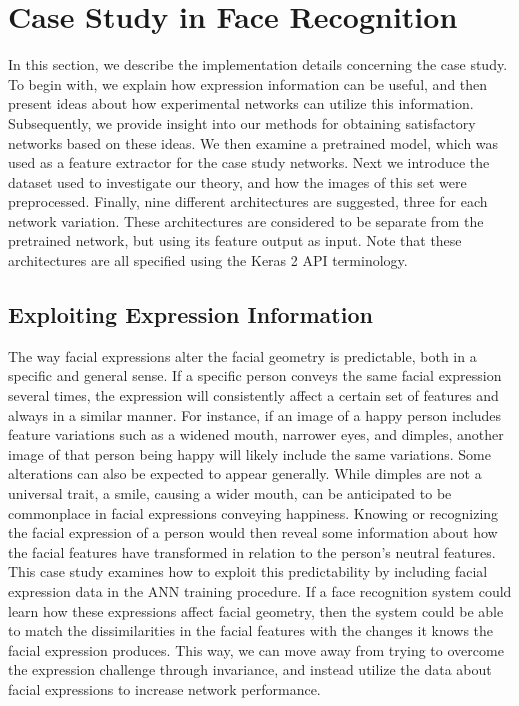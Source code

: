 \section{Case Study in Face Recognition}

In this section, we describe the implementation details concerning the case study. To begin with, we explain how expression information can be useful, and then present ideas about how experimental networks can utilize this information. Subsequently, we provide insight into our methods for obtaining satisfactory networks based on these ideas. We then examine a pretrained model, which was used as a feature extractor for the case study networks. Next we introduce the dataset used to investigate our theory, and how the images of this set were preprocessed. Finally, nine different architectures are suggested, three for each network variation. These architectures are considered to be separate from the pretrained network, but using its feature output as input. Note that these architectures are all specified using the Keras 2 API terminology.

\subsection{Exploiting Expression Information}

The way facial expressions alter the facial geometry is predictable, both in a specific and general sense. If a specific person conveys the same facial expression several times, the expression will consistently affect a certain set of features and always in a similar manner. For instance, if an image of a happy person includes feature variations such as a widened mouth, narrower eyes, and dimples, another image of that person being happy will likely include the same variations. Some alterations can also be expected to appear generally. While dimples are not a universal trait, a smile, causing a wider mouth, can be anticipated to be commonplace in facial expressions conveying happiness. Knowing or recognizing the facial expression of a person would then reveal some information about how the facial features have transformed in relation to the person's neutral features. This case study examines how to exploit this predictability by including facial expression data in the ANN training procedure. If a face recognition system could learn how these expressions affect facial geometry, then the system could be able to match the dissimilarities in the facial features with the changes it knows the facial expression produces. This way, we can move away from trying to overcome the expression challenge through invariance, and instead utilize the data about facial expressions to increase network performance.

